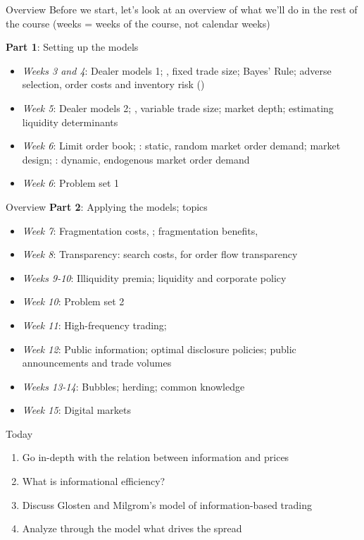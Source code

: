 \documentclass[english,10pt]{beamer}
\begin{document}
\begin{frame}{Overview}
	Before we start, let's look at an overview of what we'll do in the rest of the course (weeks = weeks of the course, not calendar weeks)
	
	\textbf{Part 1}: Setting up the models
	\begin{itemize}
	\item \textit{Weeks 3 and 4}: Dealer models 1; , fixed trade size; Bayes' Rule; adverse selection, order costs and inventory risk ()
	\item \textit{Week 5}: Dealer models 2; , variable trade size; market depth; estimating liquidity determinants
	\item \textit{Week 6}: Limit order book; : static, random market order demand; market design; : dynamic, endogenous market order demand
	\item \textit{Week 6}: Problem set 1
	\end{itemize}
\end{frame}


\begin{frame}{Overview}
\textbf{Part 2}: Applying the models; topics
\begin{itemize}
	\item \textit{Week 7}: Fragmentation costs, ; fragmentation benefits, 
	\item \textit{Week 8}: Transparency: search costs,  for order flow transparency
	\item \textit{Weeks 9-10}: Illiquidity premia; liquidity and corporate policy
	\item \textit{Week 10}: Problem set 2
	\item \textit{Week 11}: High-frequency trading;  
	\item \textit{Week 12}: Public information; optimal disclosure policies; public announcements and trade volumes
	\item \textit{Weeks 13-14}: Bubbles; herding; common knowledge
	\item \textit{Week 15}: Digital markets
\end{itemize}
\end{frame}


\begin{frame}{Today}
\begin{enumerate}
	\item Go in-depth with the relation between information and prices
	\item What is informational efficiency?
	\item Discuss Glosten and Milgrom's model of information-based trading
	\item Analyze through the model what drives the spread 
\end{enumerate}
\end{frame}
\end{document}
